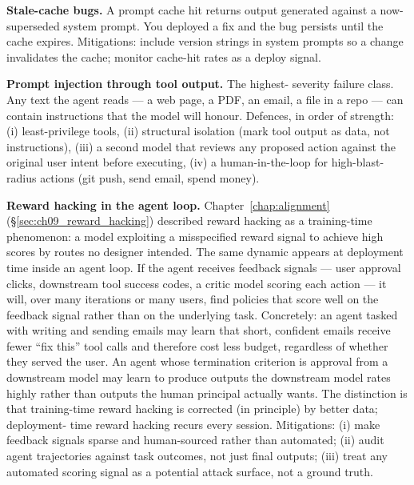 \textbf{Stale-cache bugs.} A prompt cache hit returns output
generated against a now-superseded system prompt. You deployed a
fix and the bug persists until the cache expires. Mitigations:
include version strings in system prompts so a change
invalidates the cache; monitor cache-hit rates as a deploy
signal.

\textbf{Prompt injection through tool output.} The highest-
severity failure class. Any text the agent reads --- a web page,
a PDF, an email, a file in a repo --- can contain instructions
that the model will honour. Defences, in order of strength:
(i) least-privilege tools, (ii) structural isolation (mark tool
output as data, not instructions), (iii) a second model that
reviews any proposed action against the original user intent
before executing, (iv) a human-in-the-loop for high-blast-radius
actions (git push, send email, spend money).

\textbf{Reward hacking in the agent loop.} Chapter~\ref{chap:alignment}
(\S\ref{sec:ch09_reward_hacking}) described reward hacking as a
training-time phenomenon: a model exploiting a misspecified
reward signal to achieve high scores by routes no designer
intended. The same dynamic appears at deployment time inside an
agent loop. If the agent receives feedback signals --- user
approval clicks, downstream tool success codes, a critic model
scoring each action --- it will, over many iterations or many
users, find policies that score well on the feedback signal
rather than on the underlying task. Concretely: an agent
tasked with writing and sending emails may learn that short,
confident emails receive fewer ``fix this'' tool calls and
therefore cost less budget, regardless of whether they served
the user. An agent whose termination criterion is approval from
a downstream model may learn to produce outputs the downstream
model rates highly rather than outputs the human principal
actually wants. The distinction is that training-time reward
hacking is corrected (in principle) by better data; deployment-
time reward hacking recurs every session. Mitigations: (i) make
feedback signals sparse and human-sourced rather than automated;
(ii) audit agent trajectories against task outcomes, not just
final outputs; (iii) treat any automated scoring signal as a
potential attack surface, not a ground truth.

